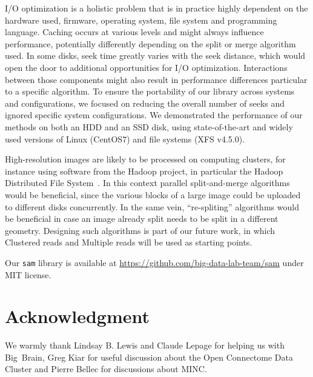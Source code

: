 \documentclass[10pt, conference, compsocconf]{IEEEtran}
\begin{document}
I/O optimization is a holistic problem that is in practice highly
dependent on the hardware used, firmware, operating system, file
system and programming language. Caching occurs at various levels and
might always influence performance, potentially differently depending
on the split or merge algorithm used. In some disks, seek time greatly
varies with the seek distance, which would open the door to additional
opportunities for I/O optimization. Interactions between those
components might also result in performance differences particular to
a specific algorithm. To ensure the portability of our library
across systems and configurations, we focused on reducing the overall
number of seeks and ignored specific system configurations. We
demonstrated the performance of our methods on both an HDD and an SSD
disk, using state-of-the-art and widely used versions of Linux
(CentOS7) and file systems (XFS v4.5.0).


High-resolution images are likely to be processed on computing
clusters, for instance using software from the Hadoop project, in
particular the Hadoop Distributed File
System~\cite{shvachko2010hadoop}. In this context parallel
split-and-merge algorithms would be beneficial, since the various
blocks of a large image could be uploaded to different disks
concurrently. In the same vein, ``re-spliting'' algorithms would be
beneficial in case an image already split needs to be split in a
different geometry. Designing such algorithms is part of our future
work, in which Clustered reads and Multiple reads will be used as
starting points.

Our \texttt{sam} library is available at
\url{https://github.com/big-data-lab-team/sam} under MIT license.


\section*{Acknowledgment}
We warmly thank Lindsay B. Lewis and Claude Lepage for helping us with
Big~Brain, Greg Kiar for useful discussion about the Open Connectome
Data Cluster and Pierre Bellec for discussions about MINC.



\end{document}
